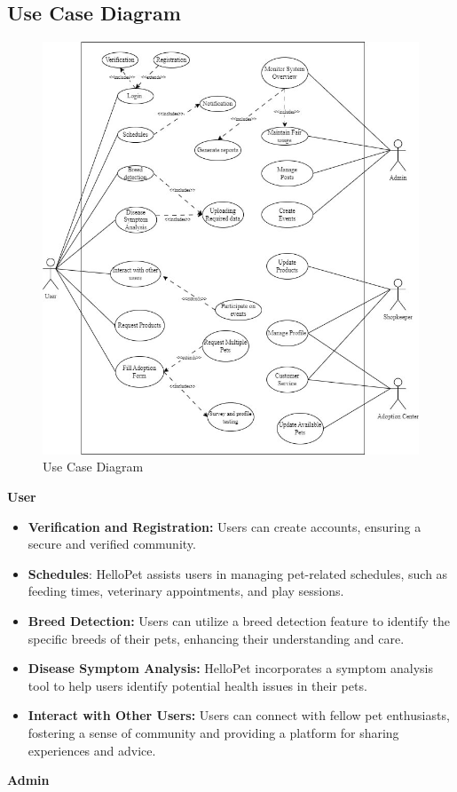 
\subsection{Use Case Diagram}
\begin{figure}[h]
    \centering
    \includegraphics[width= 6in ]{img/use_case.jpg}
    \caption{{Use Case Diagram}}
    \label{fig:use-case}
\end{figure}
\justify
\textbf{User}
\begin{itemize}
    \item \textbf{Verification and Registration:} Users can create accounts, ensuring a secure and verified community.
    \item \textbf{Schedules}: HelloPet assists users in managing pet-related schedules, such as feeding times, veterinary appointments, and play sessions. 
    \item \textbf{Breed Detection:} Users can utilize a breed detection feature to identify the specific breeds of their pets, enhancing their understanding and care.
    \item \textbf{Disease Symptom Analysis:} HelloPet incorporates a symptom analysis tool to help users identify potential health issues in their pets.
    \item \textbf{Interact with Other Users:} Users can connect with fellow pet enthusiasts, fostering a sense of community and providing a platform for sharing experiences and advice.
\end{itemize}
\textbf{Admin}

